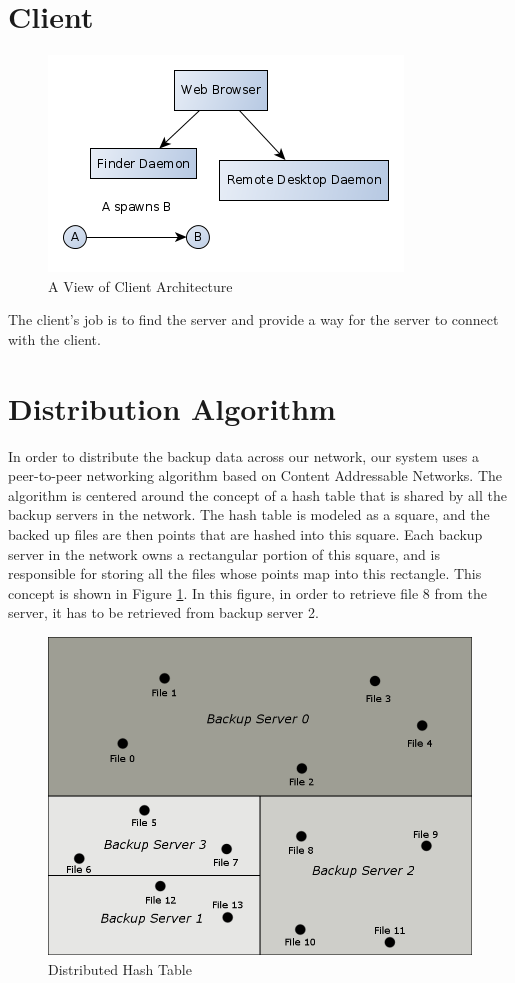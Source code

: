 \section{Client}
\begin{figure}[hb]
\centering
\includegraphics[scale=0.5]{images/client-arcitechure.png}
\caption{A View of Client Architecture}
\end{figure}

The client's job is to find the server and provide a way for the server to connect with the client.

\section{Distribution Algorithm}

In order to distribute the backup data across our network, our system uses a
peer-to-peer networking algorithm based on Content Addressable Networks. \cite{scalablecan}
The algorithm is centered around the concept of a hash table that is shared by all the backup
servers in the network. The hash table is modeled as a square, and the backed up files are then
points that are hashed into this square. Each backup server in the network owns a rectangular portion
of this square, and is responsible for storing all the files whose points map into this rectangle.
This concept is shown in Figure \ref{fig:dht_1}. In this figure, in order to retrieve file 8 from the server,
it has to be retrieved from backup server 2.

\begin{figure}[hb]
\centering
\includegraphics[scale=0.5]{images/dht_basic.png}
\caption{Distributed Hash Table}
\label{fig:dht_1}
\end{figure}

